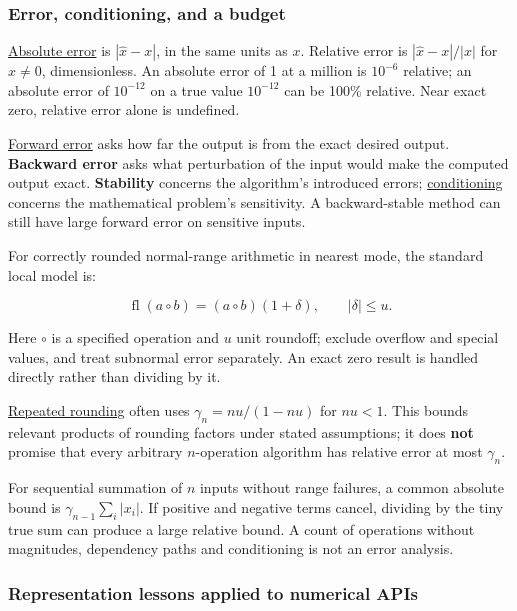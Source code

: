 \subsubsection{Error, conditioning, and a budget}\label{01-foundations-i-ch001-error-conditioning-and-a-budget}

\hypertarget{01-foundations-i-ch001-error-conditioning-and-a-budget}{}

\hyperref[appendix-3ae74e89b4e6]{Absolute error} is \(|\widehat x-x|\), in the same units as \(x\). Relative error is \(|\widehat x-x|/|x|\) for \(x\ne0\), dimensionless. An absolute error of 1 at a million is \(10^{-6}\) relative; an absolute error of \(10^{-12}\) on a true value \(10^{-12}\) can be 100\% relative. Near exact zero, relative error alone is undefined.

\hyperref[appendix-a7fbaf6d1b1c]{Forward error} asks how far the output is from the exact desired output. \textbf{Backward error} asks what perturbation of the input would make the computed output exact. \textbf{Stability} concerns the algorithm's introduced errors; \hyperref[appendix-8f6a01f284a7]{conditioning} concerns the mathematical problem's sensitivity. A backward-stable method can still have large forward error on sensitive inputs.

For correctly rounded normal-range arithmetic in nearest mode, the standard local model is:

\[
\operatorname{fl}(a\circ b)=(a\circ b)(1+\delta),\qquad |\delta|\le u.
\]

Here \(\circ\) is a specified operation and \(u\) unit roundoff; exclude overflow and special values, and treat subnormal error separately. An exact zero result is handled directly rather than dividing by it.

\hyperref[appendix-f82e270791c8]{Repeated rounding} often uses \(\gamma_n=nu/(1-nu)\) for \(nu<1\). This bounds relevant products of rounding factors under stated assumptions; it does \textbf{not} promise that every arbitrary \(n\)-operation algorithm has relative error at most \(\gamma_n\).

For sequential summation of \(n\) inputs without range failures, a common absolute bound is \(\gamma_{n-1}\sum_i|x_i|\). If positive and negative terms cancel, dividing by the tiny true sum can produce a large relative bound. A count of operations without magnitudes, dependency paths and conditioning is not an error analysis.

\subsubsection{Representation lessons applied to numerical APIs}\label{01-foundations-i-ch001-representation-lessons-applied-to-numerical-apis}

